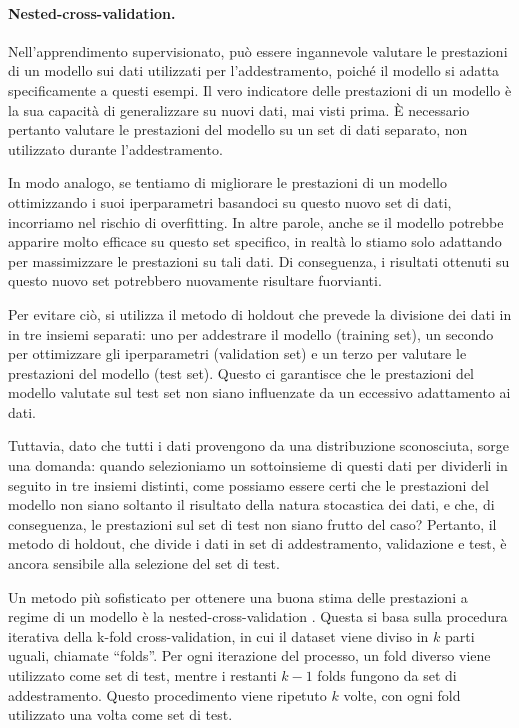 \paragraph{Nested-cross-validation.} Nell'apprendimento supervisionato, può
essere ingannevole valutare le prestazioni di un modello sui dati utilizzati
per l'addestramento, poiché il modello si adatta specificamente a questi
esempi. Il vero indicatore delle prestazioni di un modello è la sua capacità
di generalizzare su nuovi dati, mai visti prima. È necessario pertanto
valutare le prestazioni del modello su un set di dati separato, non utilizzato
durante l'addestramento.

In modo analogo, se tentiamo di migliorare le prestazioni di un modello
ottimizzando i suoi iperparametri basandoci su questo nuovo set di dati,
incorriamo nel rischio di overfitting. In altre parole, anche se il modello
potrebbe apparire molto efficace su questo set specifico, in realtà lo stiamo
solo adattando per massimizzare le prestazioni su tali dati. Di conseguenza, i
risultati ottenuti su questo nuovo set potrebbero nuovamente risultare
fuorvianti.

Per evitare ciò, si utilizza il metodo di holdout che prevede la divisione dei
dati in in tre insiemi separati: uno per addestrare il modello (training set),
un secondo per ottimizzare gli iperparametri (validation set) e un terzo per
valutare le prestazioni del modello (test set). Questo ci garantisce che le
prestazioni del modello valutate sul test set non siano influenzate da un
eccessivo adattamento ai dati.

Tuttavia, dato che tutti i dati provengono da una distribuzione sconosciuta,
sorge una domanda: quando selezioniamo un sottoinsieme di questi dati per
dividerli in seguito in tre insiemi distinti, come possiamo essere certi che
le prestazioni del modello non siano soltanto il risultato della natura
stocastica dei dati, e che, di conseguenza, le prestazioni sul set di test non
siano frutto del caso? Pertanto, il metodo di holdout, che divide i dati in
set di addestramento, validazione e test, è ancora sensibile alla selezione
del set di test.

Un metodo più sofisticato per ottenere una buona stima delle prestazioni a
regime di un modello è la nested-cross-validation \cite{cawley2010}. Questa si
basa sulla procedura iterativa della k-fold cross-validation, in cui il
dataset viene diviso in $k$ parti uguali, chiamate ``folds''. Per ogni
iterazione del processo, un fold diverso viene utilizzato come set di test,
mentre i restanti $k-1$ folds fungono da set di addestramento. Questo
procedimento viene ripetuto $k$ volte, con ogni fold utilizzato una volta come
set di test.

